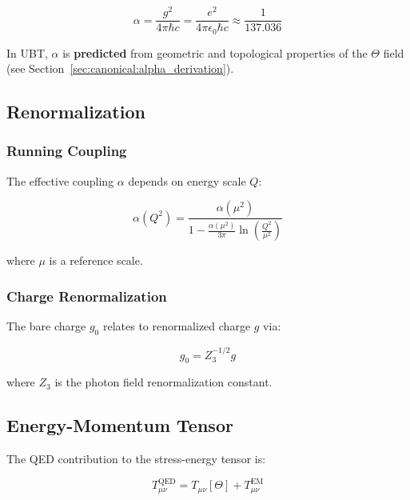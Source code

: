 \begin{equation}
\label{eq:canonical:alpha_em}
\alpha = \frac{g^2}{4\pi\hbar c} = \frac{e^2}{4\pi\epsilon_0\hbar c} \approx \frac{1}{137.036}
\end{equation}

In UBT, $\alpha$ is \textbf{predicted} from geometric and topological properties of the $\Theta$ field (see Section~\ref{sec:canonical:alpha_derivation}).

\subsection{Renormalization}

\subsubsection{Running Coupling}

The effective coupling $\alpha$ depends on energy scale $Q$:

\begin{equation}
\label{eq:canonical:alpha_running}
\alpha(Q^2) = \frac{\alpha(\mu^2)}{1 - \frac{\alpha(\mu^2)}{3\pi}\ln\left(\frac{Q^2}{\mu^2}\right)}
\end{equation}

where $\mu$ is a reference scale.

\subsubsection{Charge Renormalization}

The bare charge $g_0$ relates to renormalized charge $g$ via:

\begin{equation}
\label{eq:canonical:charge_renormalization}
g_0 = Z_3^{-1/2} g
\end{equation}

where $Z_3$ is the photon field renormalization constant.

\subsection{Energy-Momentum Tensor}

The QED contribution to the stress-energy tensor is:

\begin{equation}
\label{eq:canonical:qed_stress_energy}
T_{\mu\nu}^{\text{QED}} = T_{\mu\nu}[\Theta] + T_{\mu\nu}^{\text{EM}}
\end{equation}

